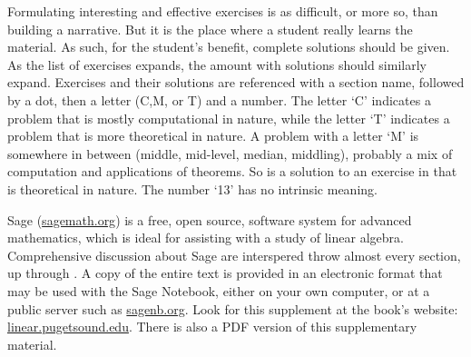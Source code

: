 %
Formulating interesting and effective exercises is as difficult, or more so, than building a narrative.  But it is the place where a student really learns the material.  As such, for the student's benefit, complete solutions should be given.  As the list of exercises expands, the amount with solutions should similarly expand.  Exercises and their solutions are referenced with a section name, followed by a dot, then a letter (C,M, or T) and a number.   The letter `C' indicates a problem that is mostly computational in nature, while the letter `T' indicates a problem that is more theoretical in nature.  A problem with a letter `M' is somewhere in between (middle, mid-level, median, middling), probably a mix of computation and applications of theorems.  So  is a solution to an exercise in  that is theoretical in nature.  The number `13' has no intrinsic meaning.\par
%
Sage (\url{sagemath.org}) is a free, open source, software system for advanced mathematics, which is ideal for assisting with a study of linear algebra. Comprehensive discussion about Sage are interspered throw almost every section, up through .  A copy of the entire text is provided in an electronic format that may be used with the Sage Notebook, either on your own computer, or at a public server such as \url{sagenb.org}.  Look for this supplement at the book's website: \url{linear.pugetsound.edu}.  There is also a PDF version of this supplementary material.
%
